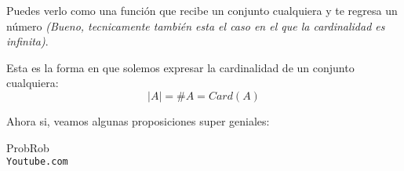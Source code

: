 \documentclass[12pt]{report}                                    %
\begin{document}
        Puedes verlo como una función que
        recibe un conjunto cualquiera y te regresa un número \emph{(Bueno, tecnicamente también
        esta el caso en el que la cardinalidad es infinita)}.

        Esta es la forma en que solemos expresar la cardinalidad de un conjunto cualquiera:
        \begin{equation}   
            |A| = \#A = Card(A)
        \end{equation}


        Ahora si, veamos algunas proposiciones super geniales:






\clearpage

	\begin{thebibliography}{9}

		ProbRob
		\\\texttt{Youtube.com}


	 

\end{thebibliography}
\end{document}
